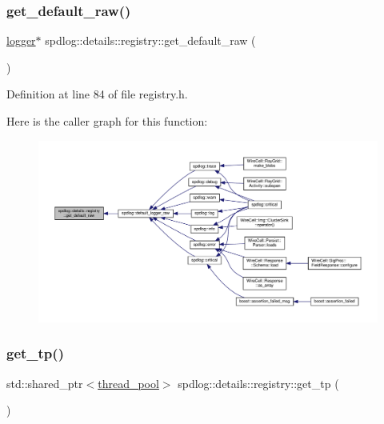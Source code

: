 \subsubsection{\texorpdfstring{get\+\_\+default\+\_\+raw()}{get\_default\_raw()}}
{\footnotesize\ttfamily \hyperlink{classspdlog_1_1logger}{logger}$\ast$ spdlog\+::details\+::registry\+::get\+\_\+default\+\_\+raw (\begin{DoxyParamCaption}{ }\end{DoxyParamCaption})\hspace{0.3cm}{\ttfamily [inline]}}



Definition at line 84 of file registry.\+h.

Here is the caller graph for this function\+:
\nopagebreak
\begin{figure}[H]
\begin{center}
\leavevmode
\includegraphics[width=350pt]{classspdlog_1_1details_1_1registry_a1fd3bc96c2a7be1af1841f5980cd5f4c_icgraph}
\end{center}
\end{figure}
\mbox{\label{classspdlog_1_1details_1_1registry_af86cd2fcbec489ebc343815f49a6e076}} 
\subsubsection{\texorpdfstring{get\+\_\+tp()}{get\_tp()}}
{\footnotesize\ttfamily std\+::shared\+\_\+ptr$<$\hyperlink{classspdlog_1_1details_1_1thread__pool}{thread\+\_\+pool}$>$ spdlog\+::details\+::registry\+::get\+\_\+tp (\begin{DoxyParamCaption}{ }\end{DoxyParamCaption})\hspace{0.3cm}{\ttfamily [inline]}}



